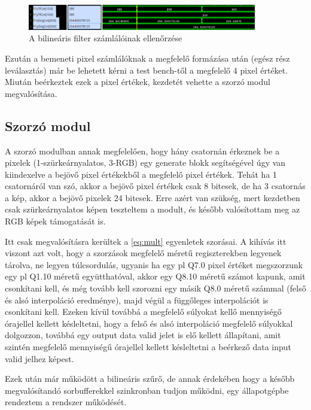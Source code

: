 \begin{figure}[!ht]
	\centering
	\includegraphics[width=100mm, keepaspectratio]{figures/bilin_counter.png}
	\caption{A bilineáris filter számlálóinak ellenőrzése} 
	\label{pic:bilin_counter}
\end{figure}

Ezután a bemeneti pixel számlálóknak a megfelelő formázása után (egész rész leválasztás) már be lehetett kérni a test bench-től a megfelelő 4 pixel értéket. Miután beérkeztek ezek a pixel értékek, kezdetét vehette a szorzó modul megvalósítása.

\subsection{Szorzó modul}

A szorzó modulban annak megfelelően, hogy hány csatornán érkeznek be a pixelek (1-szürkeárnyalatos, 3-RGB) egy generate blokk segítségével úgy van kiindexelve a bejövő pixel értékekből a megfelelő pixel értékek. Tehát ha 1 csatornáról van szó, akkor a bejövő pixel értékek csak 8 bitesek, de ha 3 csatornás a kép, akkor a bejövő pixelek 24 bitesek. Erre azért van szükség, mert kezdetben csak szürkeárnyalatos képen teszteltem a modult, és később valósítottam meg az RGB képek támogatását is. 

Itt csak megvalósításra kerültek a \ref{eq:mult} egyenletek szorásai. A kihívás itt viszont azt volt, hogy a szorzások megfelelő méretű regiszterekben legyenek tárolva, ne legyen túlcsordulás, ugyanis ha egy pl Q7.0 pixel értéket megszorzunk egy pl Q1.10 méretű együtthatóval, akkor egy Q8.10 méretű számot kapunk, amit csonkítani kell, és még tovább kell szorozni egy másik Q8.0 méretű számmal (felső és alsó interpoláció eredménye), majd végül a függőleges interpolációt is csonkítani kell. 
Ezeken kívül továbbá a megfelelő súlyokat kellő mennyiségő órajellel kellett késleltetni, hogy a felső és alsó interpoláció megfelelő súlyokkal dolgozzon, továbbá egy output data valid jelet is elő kellett állapítani, amit szintén megfelelő mennyiségű órajellel kellett késleltetni a beérkező data input valid jelhez képest.

Ezek után már működött a bilineáris szűrő, de annak érdekében hogy a később megvalósítandó sorbufferekkel szinkronban tudjon működni, egy állapotgépbe rendeztem a rendszer működését.

